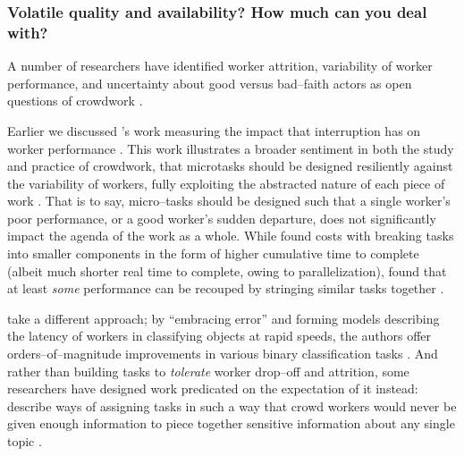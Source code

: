 \documentclass[trackingWork]{subfiles}
\begin{document}
\subsubsection{Volatile quality and availability? How much can you deal with?}\label{sec:flexibility}
A number of researchers have identified
worker attrition,
variability of worker performance,
and uncertainty about good versus bad--faith actors as open questions of crowdwork
\cite{MaliciousCrowdworkersGadiraju,Ipeirotis:2010:QMA:1837885.1837906}.

Earlier we discussed \citeauthor{cheng2015break}'s work
measuring the impact that interruption has on worker performance
\cite{cheng2015break}.
This work illustrates a broader sentiment in
both the study and practice
of crowdwork, that microtasks should be designed resiliently against the variability of workers,
fully exploiting the abstracted nature of each piece of work
\cite{interruptionIqbal,delayAndOrderLasecki,vaish2014low}.
That is to say, micro--tasks should be designed such that a single worker's poor performance,
or a good worker's sudden departure,
does not significantly impact the agenda of the work as a whole.
While \citeauthor{cheng2015break} found costs with breaking tasks into smaller components
in the form of higher cumulative time to complete
(albeit much shorter real time to complete, owing to parallelization),
\citeauthor{delayAndOrderLasecki} found that at least \textit{some} performance can be recouped by stringing 
similar tasks together
\cite[respectively]{cheng2015break,delayAndOrderLasecki}.

\citeauthor{embracingErrorKrishna} take a different approach;
by ``embracing error'' and forming models describing the latency of workers in classifying objects at rapid speeds,
the authors offer orders--of--magnitude improvements
in various binary classification tasks
\cite{embracingErrorKrishna}.
And rather than building tasks to \textit{tolerate} worker drop--off and attrition,
some researchers have designed work predicated on the expectation of it instead:
\citeauthor{sensitiveTasks} describe ways of assigning tasks in such a way that
crowd workers would never be given enough information to piece together sensitive information about
any single topic
\cite{sensitiveTasks}.
\end{document}
